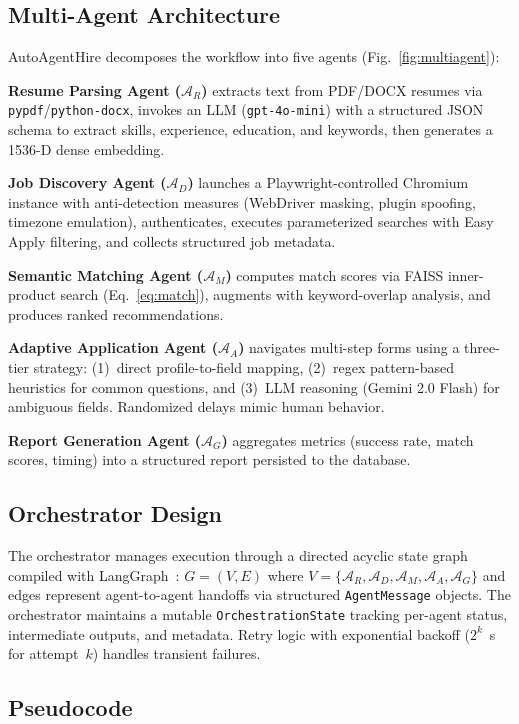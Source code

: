 \documentclass[conference]{IEEEtran}
\begin{document}
\subsection{Multi-Agent Architecture}
AutoAgentHire decomposes the workflow into five agents (Fig.~\ref{fig:multiagent}):

\textbf{Resume Parsing Agent ($\mathcal{A}_R$)} extracts text from PDF/DOCX resumes via \texttt{pypdf}/\texttt{python-docx}, invokes an LLM (\texttt{gpt-4o-mini}) with a structured JSON schema to extract skills, experience, education, and keywords, then generates a 1536-D dense embedding.

\textbf{Job Discovery Agent ($\mathcal{A}_D$)} launches a Playwright-controlled Chromium instance with anti-detection measures (WebDriver masking, plugin spoofing, timezone emulation), authenticates, executes parameterized searches with Easy Apply filtering, and collects structured job metadata.

\textbf{Semantic Matching Agent ($\mathcal{A}_M$)} computes match scores via FAISS inner-product search (Eq.~\ref{eq:match}), augments with keyword-overlap analysis, and produces ranked recommendations.

\textbf{Adaptive Application Agent ($\mathcal{A}_A$)} navigates multi-step forms using a three-tier strategy: (1)~direct profile-to-field mapping, (2)~regex pattern-based heuristics for common questions, and (3)~LLM reasoning (Gemini 2.0 Flash) for ambiguous fields. Randomized delays mimic human behavior.

\textbf{Report Generation Agent ($\mathcal{A}_G$)} aggregates metrics (success rate, match scores, timing) into a structured report persisted to the database.

\subsection{Orchestrator Design}
The orchestrator manages execution through a directed acyclic state graph compiled with LangGraph~\cite{langgraph2024}:
$G = (V, E)$ where $V = \{\mathcal{A}_R, \mathcal{A}_D, \mathcal{A}_M, \mathcal{A}_A, \mathcal{A}_G\}$ and edges represent agent-to-agent handoffs via structured \texttt{AgentMessage} objects. The orchestrator maintains a mutable \texttt{OrchestrationState} tracking per-agent status, intermediate outputs, and metadata. Retry logic with exponential backoff ($2^k$~s for attempt~$k$) handles transient failures.

\subsection{Pseudocode}
\end{document}

